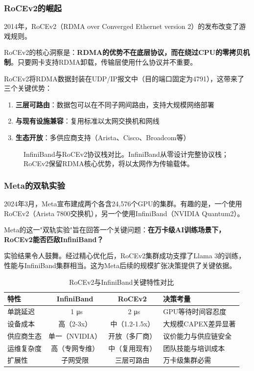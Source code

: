 \subsubsection{RoCEv2的崛起}

2014年，RoCEv2（RDMA over Converged Ethernet version 2）的发布改变了游戏规则。

RoCEv2的核心洞察是：\textbf{RDMA的优势不在底层协议，而在绕过CPU的零拷贝机制}。只要网卡支持RDMA卸载，传输层使用什么协议并不重要。

RoCEv2将RDMA数据封装在UDP/IP报文中（目的端口固定为4791），这带来了三个关键优势：

\begin{enumerate}
    \item \textbf{三层可路由}：数据包可以在不同子网间路由，支持大规模网络部署
    \item \textbf{与现有设施兼容}：复用标准以太网交换机和网线
    \item \textbf{生态开放}：多供应商支持（Arista、Cisco、Broadcom等）
\end{enumerate}

\begin{figure}[htbp]
\centering

\caption{InfiniBand与RoCEv2协议栈对比。InfiniBand从零设计完整协议栈；RoCEv2保留RDMA核心优势，将以太网作为传输载体。}
\label{fig:rocev2_vs_ib}
\end{figure}

\subsubsection{Meta的双轨实验}

2024年3月，Meta宣布建成两个各含24,576个GPU的集群。有趣的是，一个使用RoCEv2（Arista 7800交换机），另一个使用InfiniBand（NVIDIA Quantum2）。

Meta的这一"双轨实验"旨在回答一个关键问题：\textbf{在万卡级AI训练场景下，RoCEv2能否匹敌InfiniBand？}

实验结果令人鼓舞。经过精心优化后，RoCEv2集群成功支撑了Llama 3的训练，性能与InfiniBand集群相当。这为Meta后续的规模扩张决策提供了关键依据。

\begin{table}[htbp]
\centering
\caption{RoCEv2与InfiniBand关键特性对比}
\label{tab:rocev2_ib_comparison}
\begin{tabular}{|l|c|c|l|}
\hline
\textbf{特性} & \textbf{InfiniBand} & \textbf{RoCEv2} & \textbf{决策考量} \\
\hline
单跳延迟 & ~1 μs & ~2 μs & GPU等待时间容忍度 \\
\hline
设备成本 & 高（2-3x） & 中（1.2-1.5x） & 大规模CAPEX差异显著 \\
\hline
供应商生态 & 单一（NVIDIA） & 开放（多厂商） & 议价能力与供应链安全 \\
\hline
运维复杂度 & 高（专网专维） & 中（复用现有） & 团队技能与培训成本 \\
\hline
扩展性 & 子网受限 & 三层可路由 & 万卡级集群必需 \\
\hline
\end{tabular}
\end{table}

